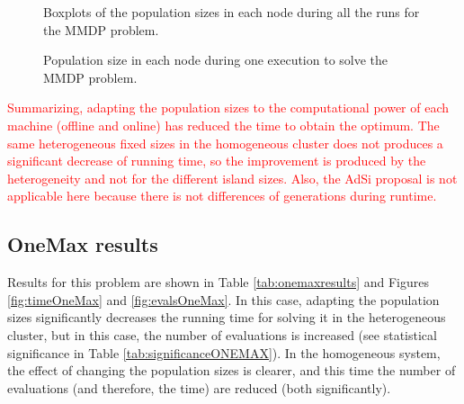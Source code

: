 \documentclass[final,1p,times]{elsarticle}
\begin{document}
\begin{figure}[htb]
\centering
{}
\caption{Boxplots of the population sizes in each node during all the runs for the MMDP problem.}
\label{fig:sizesMMDP}
\end{figure}

\begin{figure}[htb]
\centering
{}
\caption{Population size in each node during one execution to solve the MMDP problem.}
\label{fig:sizesMMDP1ejec}
\end{figure}

\begin{table}
\end{table}


\textcolor{red}{Summarizing, adapting the population sizes to the computational power of each machine (offline and online) has reduced the time to obtain the optimum. The same heterogeneous fixed sizes in the homogeneous cluster does not produces a significant decrease of running time, so the improvement is produced by the heterogeneity and not for the different island sizes. Also, the AdSi proposal is not applicable here because there is not differences of generations during runtime.}


\subsection{OneMax results}

Results for this problem are shown in Table \ref{tab:onemaxresults} and Figures  \ref{fig:timeOneMax} and \ref{fig:evalsOneMax}. In this case, adapting the population sizes significantly decreases  the running time for solving it in the heterogeneous cluster, but in this case, the number of evaluations is increased (see statistical significance in Table \ref{tab:significanceONEMAX}). In the homogeneous system, the effect of changing the population sizes is clearer, and this time the number of evaluations (and therefore, the time) are reduced (both significantly). 
\end{document}
